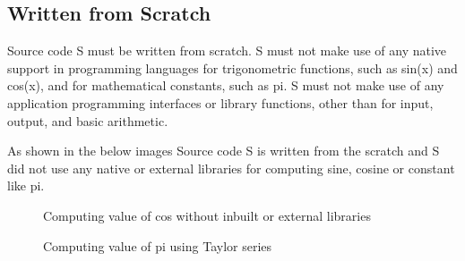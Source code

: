 \subsection{Written from Scratch}
\begin{flushleft}
    Source code S must be written from scratch. S must not make use of any native support in programming languages for trigonometric functions, such as sin(x) and cos(x), and for mathematical constants, such as pi. S must not make use of any application programming interfaces or library functions, other than for input, output, and basic arithmetic.
\end{flushleft}
\begin{flushleft}
    As shown in the below images Source code S is written from the scratch and S did not use any native or external libraries for computing sine, cosine or constant like pi.
\end{flushleft}
\begin{figure}[h!]
    \centering
    \vspace{.5cm}
    \caption{Computing value of cos without inbuilt or external libraries}
    \label{fig:cos }
  \end{figure}
  \begin{figure}[h!]
    \centering
    \vspace{.5cm}
    \caption{Computing value of pi using Taylor series}
    \label{fig:pi }
  \end{figure}
